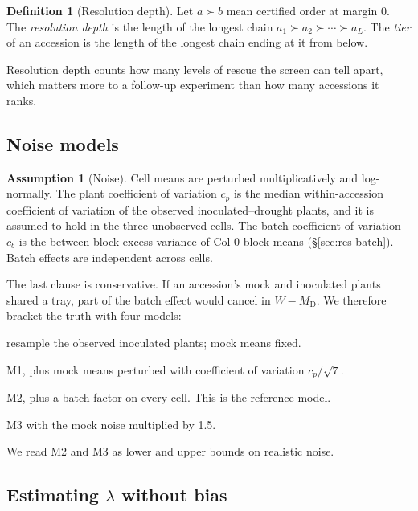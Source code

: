 \documentclass[10pt,twocolumn,a4paper]{article}
\theoremstyle{definition}
\newtheorem{definition}{Definition}[section]
\newtheorem{assumption}{Assumption}[section]
\theoremstyle{remark}
\newcommand{\MD}{{M_{\mathrm D}}}
\newcommand{\WD}{W}
\begin{document}
\begin{definition}[Resolution depth]
\label{def:depth}
Let $a\succ b$ mean certified order at margin $0$. The \emph{resolution
depth} is the length of the longest chain $a_1\succ a_2\succ\cdots\succ
a_L$. The \emph{tier} of an accession is the length of the longest chain
ending at it from below.
\end{definition}

Resolution depth counts how many levels of rescue the screen can tell
apart, which matters more to a follow-up experiment than how many
accessions it ranks.

\subsection{Noise models}
\label{sec:noise}

\begin{assumption}[Noise]
\label{ass:noise}
Cell means are perturbed multiplicatively and log-normally. The plant
coefficient of variation $c_p$ is the median within-accession coefficient
of variation of the observed inoculated--drought plants, and it is
assumed to hold in the three unobserved cells. The batch coefficient of
variation $c_b$ is the between-block excess variance of Col-0 block
means (\S\ref{sec:res-batch}). Batch effects are independent across
cells.
\end{assumption}

The last clause is conservative. If an accession's mock and inoculated
plants shared a tray, part of the batch effect would cancel in $\WD-\MD$.
We therefore bracket the truth with four models:
\begin{description}[leftmargin=1.3em,itemsep=1pt,font=\normalfont\itshape]
  \item[M1] resample the observed inoculated plants; mock means fixed.
  \item[M2] M1, plus mock means perturbed with coefficient of variation
  $c_p/\sqrt 7$.
  \item[M3] M2, plus a batch factor on every cell. This is the reference
  model.
  \item[M4] M3 with the mock noise multiplied by 1.5.
\end{description}
We read M2 and M3 as lower and upper bounds on realistic noise.

\subsection{Estimating $\lambda$ without bias}
\label{sec:methods-lambda}
\end{document}
